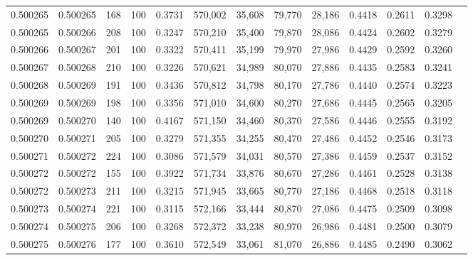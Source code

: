 \begin{tabular}{rrrrrrrrrrrrr}
0.500265 & 0.500265 &   168 & 100 &                                     0.3731 & 570,002 &  35,608 &  79,770 &  28,186 & 0.4418 & 0.2611 & 0.3298 \\
0.500265 & 0.500266 &   208 & 100 &                                     0.3247 & 570,210 &  35,400 &  79,870 &  28,086 & 0.4424 & 0.2602 & 0.3279 \\
0.500266 & 0.500267 &   201 & 100 &                                     0.3322 & 570,411 &  35,199 &  79,970 &  27,986 & 0.4429 & 0.2592 & 0.3260 \\
0.500267 & 0.500268 &   210 & 100 &                                     0.3226 & 570,621 &  34,989 &  80,070 &  27,886 & 0.4435 & 0.2583 & 0.3241 \\
0.500268 & 0.500269 &   191 & 100 &                                     0.3436 & 570,812 &  34,798 &  80,170 &  27,786 & 0.4440 & 0.2574 & 0.3223 \\
0.500269 & 0.500269 &   198 & 100 &                                     0.3356 & 571,010 &  34,600 &  80,270 &  27,686 & 0.4445 & 0.2565 & 0.3205 \\
0.500269 & 0.500270 &   140 & 100 &                                     0.4167 & 571,150 &  34,460 &  80,370 &  27,586 & 0.4446 & 0.2555 & 0.3192 \\
0.500270 & 0.500271 &   205 & 100 &                                     0.3279 & 571,355 &  34,255 &  80,470 &  27,486 & 0.4452 & 0.2546 & 0.3173 \\
0.500271 & 0.500272 &   224 & 100 &                                     0.3086 & 571,579 &  34,031 &  80,570 &  27,386 & 0.4459 & 0.2537 & 0.3152 \\
0.500272 & 0.500272 &   155 & 100 &                                     0.3922 & 571,734 &  33,876 &  80,670 &  27,286 & 0.4461 & 0.2528 & 0.3138 \\
0.500272 & 0.500273 &   211 & 100 &                                     0.3215 & 571,945 &  33,665 &  80,770 &  27,186 & 0.4468 & 0.2518 & 0.3118 \\
0.500273 & 0.500274 &   221 & 100 &                                     0.3115 & 572,166 &  33,444 &  80,870 &  27,086 & 0.4475 & 0.2509 & 0.3098 \\
0.500274 & 0.500275 &   206 & 100 &                                     0.3268 & 572,372 &  33,238 &  80,970 &  26,986 & 0.4481 & 0.2500 & 0.3079 \\
0.500275 & 0.500276 &   177 & 100 &                                     0.3610 & 572,549 &  33,061 &  81,070 &  26,886 & 0.4485 & 0.2490 & 0.3062 \\

\end{tabular}
